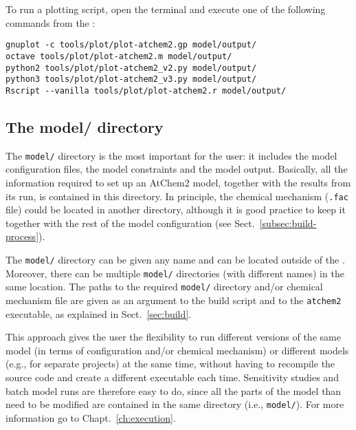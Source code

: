 To run a plotting script, open the terminal and execute one of the
following commands from the \maindir:

\begin{verbatim}
gnuplot -c tools/plot/plot-atchem2.gp model/output/
octave tools/plot/plot-atchem2.m model/output/
python2 tools/plot/plot-atchem2_v2.py model/output/
python3 tools/plot/plot-atchem2_v3.py model/output/
Rscript --vanilla tools/plot/plot-atchem2.r model/output/
\end{verbatim}

\subsection{The model/ directory} \label{subsec:model-directory}

The \texttt{model/} directory is the most important for the user: it
includes the model configuration files, the model constraints and the
model output. Basically, all the information required to set up an
AtChem2 model, together with the results from its run, is contained in
this directory. In principle, the chemical mechanism (\texttt{.fac}
file) could be located in another directory, although it is good
practice to keep it together with the rest of the model configuration
(see Sect.~\ref{subsec:build-process}).

The \texttt{model/} directory can be given any name and can be located
outside of the \maindir. Moreover, there can be multiple
\texttt{model/} directories (with different names) in the same
location. The paths to the required \texttt{model/} directory and/or
chemical mechanism file are given as an argument to the build script
and to the \texttt{atchem2} executable, as explained in
Sect.~\ref{sec:build}.

This approach gives the user the flexibility to run different versions
of the same model (in terms of configuration and/or chemical
mechanism) or different models (e.g., for separate projects) at the
same time, without having to recompile the source code and create a
different executable each time. Sensitivity studies and batch model
runs are therefore easy to do, since all the parts of the model than
need to be modified are contained in the same directory (i.e.,
\texttt{model/}). For more information go to Chapt.~\ref{ch:execution}.
